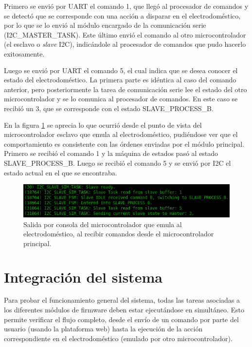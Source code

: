 Primero se envió por UART el comando 1, que llegó al procesador de comandos y se detectó que se corresponde con una acción a disparar en el electrodoméstico, por lo que se lo envió al módulo encargado de la comunicación serie (I2C\_MASTER\_TASK). Este último envió el comando al otro microcontrolador (el esclavo o \emph{slave} I2C), indicándole al procesador de comandos que pudo hacerlo exitosamente.

Luego se envió por UART el comando 5, el cual indica que se desea conocer el estado del electrodoméstico. La primera parte es idéntica al caso del comando anterior, pero posteriormente la tarea de comunicación serie lee el estado del otro microcontrolador y se lo comunica al procesador de comandos. En este caso se recibió un 3, que se corresponde con el estado SLAVE\_PROCESS\_B.

En la figura \ref{fig:output_slave_i2c} se aprecia lo que ocurrió desde el punto de vista del microcontrolador esclavo que emula al electrodoméstico, pudiéndose ver que el comportamiento es consistente con las órdenes enviadas por el módulo principal. Primero se recibió el comando 1 y la máquina de estados pasó al estado SLAVE\_PROCESS\_B. Luego se recibió el comando 5 y se envió por I2C el estado actual en el que se encontraba.


\begin{figure}[h]
\centering
\includegraphics[width=\textwidth]{./Figures/output_slave_i2c.png}
\caption{Salida por consola del microcontrolador que emula al electrodoméstico, al recibir comandos desde el microcontrolador principal.}
\label{fig:output_slave_i2c}
\end{figure}

\section{Integración del sistema}

Para probar el funcionamiento general del sistema, todas las tareas asociadas a los diferentes módulos de firmware deben estar ejecutándose en simultáneo. Esto permite verificar el flujo completo, desde el envío de un comando por parte del usuario (usando la plataforma web) hasta la ejecución de la acción correspondiente en el electrodoméstico (emulado por otro microcontrolador).

